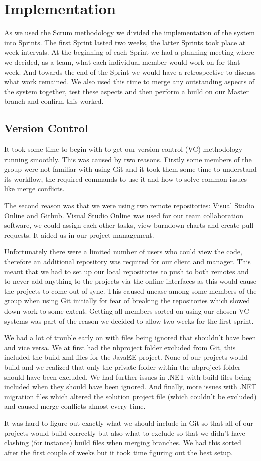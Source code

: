 \chapter{Implementation}

As we used the Scrum methodology we divided the implementation of the system into Sprints. The first Sprint lasted two weeks, the latter Sprints took place at week intervals. At the beginning of each Sprint we had a planning meeting where we decided, as a team, what each individual member would work on for that week. And towards the end of the Sprint we would have a retrospective to discuss what work remained. We also used this time to merge any outstanding aspects of the system together, test these aspects and then perform a build on our Master branch and confirm this worked.
\section{Version Control}
It took some time to begin with to get our version control (VC) methodology running smoothly. This was caused by two reasons. Firstly some members of the group were not familiar with using Git and it took them some time to understand its workflow, the required commands to use it and how to solve common issues like merge conflicts. \par
The second reason was that we were using two remote repositories: Visual Studio Online\cite{VSO} and Github\cite{Github}. Visual Studio Online was used for our team collaboration software, we could assign each other tasks, view burndown charts and create pull requests. It aided us in our project management. \par
Unfortunately there were a limited number of users who could view the code, therefore an additional repository was required for our client and manager. This meant that we had to set up our local repositories to push to both remotes and to never add anything to the projects via the online interfaces as this would cause the projects to come out of sync. This caused unease among some members of the group when using Git initially for fear of breaking the repositories which slowed down work to some extent. Getting all members sorted on using our chosen VC systems was part of the reason we decided to allow two weeks for the first sprint. \par
We had a lot of trouble early on with files being ignored that shouldn’t have been and vice versa. We at first had the nbproject folder excluded from Git, this included the build xml files for the JavaEE project. None of our projects would build and we realized that only the private folder within the nbproject folder should have been excluded. We had further issues in .NET with build files being included when they should have been ignored. And finally, more issues with .NET migration files which altered the solution project file (which couldn’t be excluded) and caused merge conflicts almost every time. \par
It was hard to figure out exactly what we should include in Git so that all of our projects would build correctly but also what to exclude so that we didn’t have clashing (for instance) build files when merging branches. We had this sorted after the first couple of weeks but it took time figuring out the best setup. 
